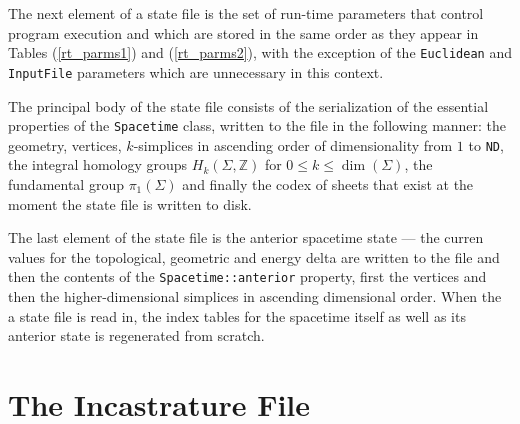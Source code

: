 \documentclass[12pt,letterpaper]{report}
\begin{document}
The next element of a state file is the set of run-time parameters that control program execution and 
which are stored in the same order as they appear in Tables (\ref{rt_parms1}) and (\ref{rt_parms2}), 
with the exception of the \texttt{Euclidean} and \texttt{InputFile} parameters which are unnecessary 
in this context.

The principal body of the state file consists of the serialization of the essential properties of the 
\texttt{Spacetime} class, written to the file in the following manner: the geometry, vertices, $k$-simplices in 
ascending order of dimensionality from $1$ to \texttt{ND}, the integral homology groups $H_k(\Sigma,
\mathbb{Z})$ for $0\le k \le \dim(\Sigma)$, the fundamental group $\pi_1(\Sigma)$ and finally the codex 
of sheets that exist at the moment the state file is written to disk.

The last element of the state file is the anterior spacetime state --- the curren values for the 
topological, geometric and energy delta are written to the file and then the contents of the 
\texttt{Spacetime::anterior} property, first the vertices and then the higher-dimensional simplices 
in ascending dimensional order. When the a state file is read in, the index tables for the spacetime 
itself as well as its anterior state is regenerated from scratch.  
 
\section{The Incastrature File}
\end{document}
